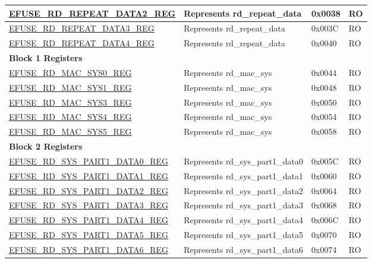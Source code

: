 \begin{longtable}{ | p{7cm} | p{6cm} | p{1.2cm} | p{1.5cm} | }
\hyperref[regdesc:EFUSERDREPEATDATA2REG]{EFUSE\_RD\_REPEAT\_DATA2\_REG} & Represents rd\_repeat\_data & 0x0038 & RO \\ \hline
\hyperref[regdesc:EFUSERDREPEATDATA3REG]{EFUSE\_RD\_REPEAT\_DATA3\_REG} & Represents rd\_repeat\_data & 0x003C & RO \\ \hline
\hyperref[regdesc:EFUSERDREPEATDATA4REG]{EFUSE\_RD\_REPEAT\_DATA4\_REG} & Represents rd\_repeat\_data & 0x0040 & RO \\ \hline
\multicolumn{4}{|l|}{\textbf{Block 1 Registers}} \\ \hline
\hyperref[regdesc:EFUSERDMACSYS0REG]{EFUSE\_RD\_MAC\_SYS0\_REG} & Represents rd\_mac\_sys & 0x0044 & RO \\ \hline
\hyperref[regdesc:EFUSERDMACSYS1REG]{EFUSE\_RD\_MAC\_SYS1\_REG} & Represents rd\_mac\_sys & 0x0048 & RO \\ \hline
\hyperref[regdesc:EFUSERDMACSYS3REG]{EFUSE\_RD\_MAC\_SYS3\_REG} & Represents rd\_mac\_sys & 0x0050 & RO \\ \hline
\hyperref[regdesc:EFUSERDMACSYS4REG]{EFUSE\_RD\_MAC\_SYS4\_REG} & Represents rd\_mac\_sys & 0x0054 & RO \\ \hline
\hyperref[regdesc:EFUSERDMACSYS5REG]{EFUSE\_RD\_MAC\_SYS5\_REG} & Represents rd\_mac\_sys & 0x0058 & RO \\ \hline
\multicolumn{4}{|l|}{\textbf{Block 2 Registers}} \\ \hline
\hyperref[regdesc:EFUSERDSYSPART1DATANREG]{EFUSE\_RD\_SYS\_PART1\_DATA0\_REG} & Represents rd\_sys\_part1\_data0 & 0x005C & RO \\ \hline
\hyperref[regdesc:EFUSERDSYSPART1DATANREG]{EFUSE\_RD\_SYS\_PART1\_DATA1\_REG} & Represents rd\_sys\_part1\_data1 & 0x0060 & RO \\ \hline
\hyperref[regdesc:EFUSERDSYSPART1DATANREG]{EFUSE\_RD\_SYS\_PART1\_DATA2\_REG} & Represents rd\_sys\_part1\_data2 & 0x0064 & RO \\ \hline
\hyperref[regdesc:EFUSERDSYSPART1DATANREG]{EFUSE\_RD\_SYS\_PART1\_DATA3\_REG} & Represents rd\_sys\_part1\_data3 & 0x0068 & RO \\ \hline
\hyperref[regdesc:EFUSERDSYSPART1DATANREG]{EFUSE\_RD\_SYS\_PART1\_DATA4\_REG} & Represents rd\_sys\_part1\_data4 & 0x006C & RO \\ \hline
\hyperref[regdesc:EFUSERDSYSPART1DATANREG]{EFUSE\_RD\_SYS\_PART1\_DATA5\_REG} & Represents rd\_sys\_part1\_data5 & 0x0070 & RO \\ \hline
\hyperref[regdesc:EFUSERDSYSPART1DATANREG]{EFUSE\_RD\_SYS\_PART1\_DATA6\_REG} & Represents rd\_sys\_part1\_data6 & 0x0074 & RO \\ \hline

\end{longtable}
